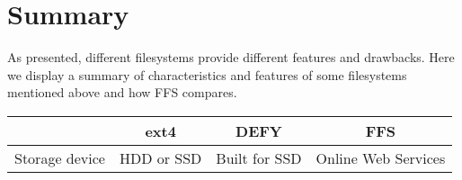 
\section{Summary} %



As presented, different filesystems provide different features and drawbacks. Here we display a summary of characteristics and features of some filesystems mentioned above and how FFS compares.

\begin{center}
	\begin{tabular}{ c || c | c | c }
		
		\hline
		\hspace{1mm} & 		ext4 & 			DEFY & 				FFS\\
		
		\hline
		\hline
		
		Storage device & 	HDD or SSD 	& 	Built for SSD & 	Online Web Services

		\hline

		

	\end{tabular}
\end{center}